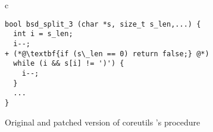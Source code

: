 \begin{figure}
\centering
\begin{tabular}{c}
\begin{lstlisting}
bool bsd_split_3 (char *s, size_t s_len,...) {
  int i = s_len;
  i--;
+ (*@\textbf{if (s\_len == 0) return false;} @*)
  while (i && s[i] != ')') { 
    i--;
  }
  ...
}
\end{lstlisting}
%
\end{tabular}
\caption{Original and patched version of coreutils 's  procedure}
\end{figure} 
